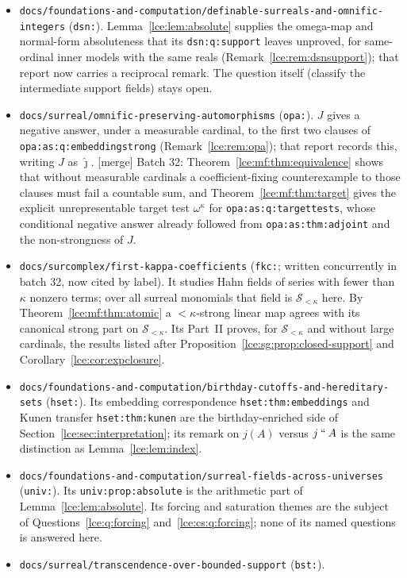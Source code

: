 \documentclass[11pt,letterpaper]{article}
\numberwithin{equation}{section}
\theoremstyle{definition}
\theoremstyle{remark}
\newcommand{\Sk}{\mathscr S_{<\kappa}}
\newcommand{\imset}[2]{#1\mathbin{``}#2}
\newcommand{\thref}[1]{Theorem~\ref{#1}}
\newcommand{\prref}[1]{Proposition~\ref{#1}}
\newcommand{\leref}[1]{Lemma~\ref{#1}}
\newcommand{\mergetag}{\textup{\textsf{\small[merge]}}}%
\newcommand{\lbl}[1]{\nolinkurl{#1}}%
\newcommand{\fn}[1]{\nolinkurl{#1}}%
\begin{document}
\begin{itemize}
\item \fn{docs/foundations-and-computation/definable-surreals-and-omnific-integers}
(\lbl{dsn:}). \leref{lce:lem:absolute} supplies the omega-map and
normal-form absoluteness that its \lbl{dsn:q:support} leaves unproved, for
same-ordinal inner models with the same reals (Remark~\ref{lce:rem:dsnsupport});
that report now carries a reciprocal remark. The question itself (classify
the intermediate support fields) stays open.
\item \fn{docs/surreal/omnific-preserving-automorphisms} (\lbl{opa:}). $J$
gives a negative answer, under a measurable cardinal, to the first two
clauses of \lbl{opa:as:q:embeddingstrong} (Remark~\ref{lce:rem:opa}); that
report records this, writing $J$ as $\hat\jmath$. \mergetag{} Batch 32:
\thref{lce:mf:thm:equivalence} shows that without measurable cardinals a
coefficient-fixing counterexample to those clauses must fail a countable
sum, and \thref{lce:mf:thm:target} gives the explicit unrepresentable target
test $\omega^\kappa$ for \lbl{opa:as:q:targettests}, whose conditional
negative answer already followed from \lbl{opa:as:thm:adjoint} and the
non-strongness of $J$.
\item \fn{docs/surcomplex/first-kappa-coefficients} (\lbl{fkc:}; written
concurrently in batch 32, now cited by label). It studies Hahn fields of
series with fewer than $\kappa$ nonzero terms; over all surreal monomials
that field is $\Sk$ here. By \thref{lce:mf:thm:atomic} a ${<}\kappa$-strong
linear map agrees with its canonical strong part on $\Sk$. Its Part~II
proves, for $\Sk$ and without large cardinals, the results listed after
\prref{lce:sg:prop:closed-support} and Corollary~\ref{lce:cor:expclosure}.
\item \fn{docs/foundations-and-computation/birthday-cutoffs-and-hereditary-sets}
(\lbl{hset:}). Its embedding correspondence \lbl{hset:thm:embeddings} and
Kunen transfer \lbl{hset:thm:kunen} are the birthday-enriched side of
Section~\ref{lce:sec:interpretation}; its remark on $j(A)$ versus $\imset
jA$ is the same distinction as \leref{lce:lem:index}.
\item \fn{docs/foundations-and-computation/surreal-fields-across-universes}
(\lbl{univ:}). Its \lbl{univ:prop:absolute} is the arithmetic part of
\leref{lce:lem:absolute}. Its forcing and saturation themes are the subject
of Questions~\ref{lce:q:forcing} and~\ref{lce:cs:q:forcing}; none of its
named questions is answered here.
\item \fn{docs/surreal/transcendence-over-bounded-support} (\lbl{bst:}).

\end{itemize}
\end{document}
